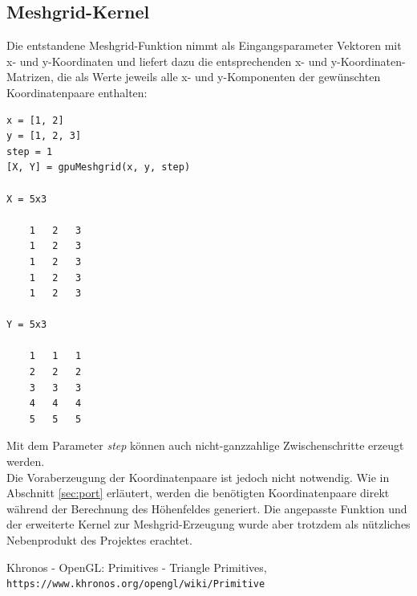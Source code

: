 \documentclass[conference]{IEEEtran}
\begin{document}
\subsection{Meshgrid-Kernel}
Die entstandene Meshgrid-Funktion nimmt als Eingangsparameter Vektoren mit x- und y-Koordinaten und liefert dazu die entsprechenden x- und y-Koordinaten-Matrizen, die als Werte jeweils alle x- und y-Komponenten der gew\"unschten Koordinatenpaare enthalten:
\begin{lstlisting}[caption=Meshgrid-Generierung - Pseudo-Code, captionpos=b]
x = [1, 2]
y = [1, 2, 3]
step = 1
[X, Y] = gpuMeshgrid(x, y, step)

X = 5x3
	
	1	2	3
	1	2	3
	1	2	3
	1	2	3
	1	2	3
	
Y = 5x3
	
	1	1	1
	2	2	2
	3	3	3
	4	4	4
	5	5	5
\end{lstlisting}
Mit dem Parameter \textit{step} k\"onnen auch nicht-ganzzahlige Zwischenschritte erzeugt werden.\\Die Voraberzeugung der Koordinatenpaare ist jedoch nicht notwendig. Wie in Abschnitt \ref{sec:port} erl\"autert, werden die ben\"otigten Koordinatenpaare direkt w\"ahrend der Berechnung des H\"ohenfeldes generiert. Die angepasste Funktion und der erweiterte Kernel zur Meshgrid-Erzeugung wurde aber trotzdem als n\"utzliches Nebenprodukt des Projektes erachtet. 

\begin{thebibliography}{00}
Khronos - OpenGL: Primitives - Triangle Primitives,
\\\texttt{https://www.khronos.org/opengl/wiki/Primitive}
\end{thebibliography}
\end{document}
